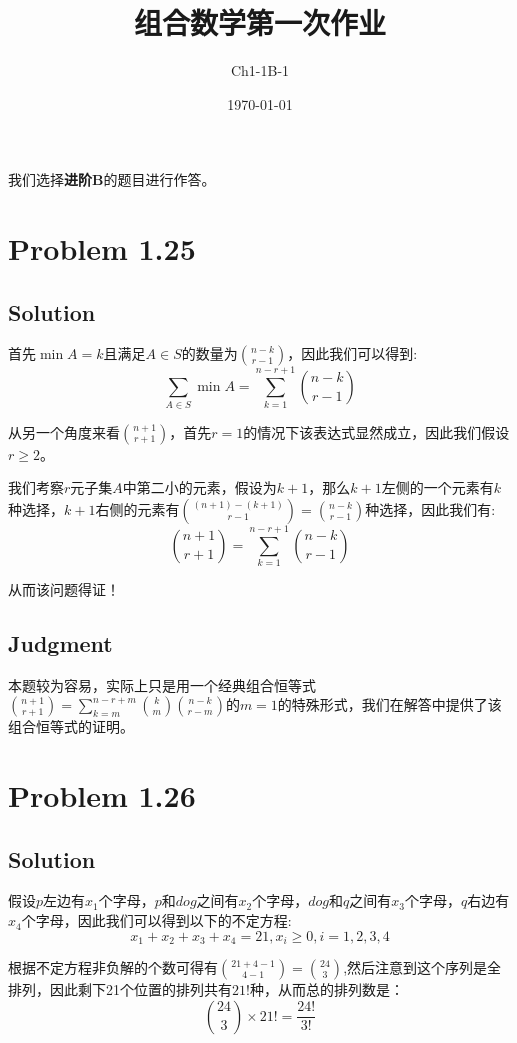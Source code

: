 \documentclass[a4paper]{ctexart}
\title{组合数学第一次作业}
\author{Ch1-1B-1}
\date{\today}
\begin{document}
\maketitle
\thispagestyle{empty}		%

\tableofcontents
\thispagestyle{empty}		%

\newpage
\setcounter{page}{1}

我们选择\textbf{进阶B}的题目进行作答。
\section{Problem 1.25}
\subsection{Solution}
首先$\min A = k$且满足$A\in S$的数量为$\binom{n-k}{r-1}$，因此我们可以得到:
\begin{equation}
    \sum_{A\in S} \min A = \sum_{k=1}^{n-r+1} \binom{n-k}{r-1}
\end{equation}
\par
从另一个角度来看$\binom{n+1}{r+1}$，首先$r=1$的情况下该表达式显然成立，因此我们假设$r\geq 2$。
\par
我们考察$r$元子集$A$中第二小的元素，假设为$k+1$，那么$k+1$左侧的一个元素有$k$种选择，$k+1$右侧的元素有$\binom{(n+1)-(k+1)}{r-1}=\binom{n-k}{r-1}$种选择，因此我们有:
\begin{equation}
    \binom{n+1}{r+1} = \sum_{k=1}^{n-r+1} \binom{n-k}{r-1}
\end{equation}
\par
从而该问题得证！

\subsection{Judgment}
本题较为容易，实际上只是用一个经典组合恒等式$\binom{n+1}{r+1} = \sum_{k=m}^{n-r+m}\binom{k}{m}\binom{n-k}{r-m}$的$m=1$的特殊形式，我们在解答中提供了该组合恒等式的证明。

\section{Problem 1.26}
\subsection{Solution}
假设$p$左边有$x_1$个字母，$p$和$dog$之间有$x_2$个字母，$dog$和$q$之间有$x_3$个字母，$q$右边有$x_4$个字母，因此我们可以得到以下的不定方程:
\begin{equation}
    x_1 + x_2 + x_3 + x_4 = 21, x_i\geq 0,i = 1,2,3,4
\end{equation}
\par
根据不定方程非负解的个数可得有$\binom{21+4-1}{4-1} = \binom{24}{3}$,然后注意到这个序列是全排列，因此剩下21个位置的排列共有$21!$种，从而总的排列数是：
\begin{equation}
    \binom{24}{3}\times 21! = \frac{24!}{3!}
\end{equation}
\end{document}
